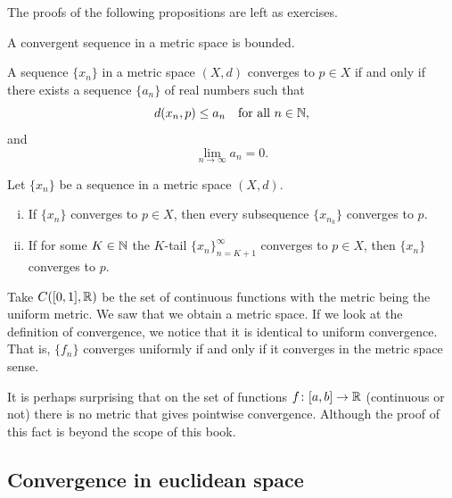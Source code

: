 The proofs of the following propositions are left as exercises.

\begin{prop} \label{prop:msconvbound}
A convergent sequence in a metric space is bounded.
\end{prop}

\begin{prop} \label{prop:msconvifa}
A sequence $\{ x_n \}$ in a metric space $(X,d)$ converges to $p \in X$
if and only
if there exists a sequence $\{ a_n \}$ of real numbers such that
\begin{equation*}
d(x_n,p) \leq a_n \quad \text{for all } n \in {\mathbb{N}},
\end{equation*}
and
\begin{equation*}
\lim_{n\to\infty} a_n = 0.
\end{equation*}
\end{prop}

\begin{prop} \label{prop:mssubseq}
Let $\{ x_n \}$ be a sequence in a metric space $(X,d)$.
\begin{enumerate}[(i)]
\item If $\{ x_n \}$ converges to $p \in X$, then every subsequence $\{ x_{n_k} \}$
converges to $p$.
\item If for some $K \in {\mathbb{N}}$ the $K$-tail $\{ x_n \}_{n=K+1}^\infty$
converges to $p \in X$, then
 $\{ x_n \}$ converges to $p$.
\end{enumerate}
\end{prop}

\begin{example}
Take $C([0,1],{\mathbb{R}})$ be the set of continuous functions with the metric being
the uniform metric.  We saw that we obtain a metric space.
If we look at the definition of convergence, we notice that it is identical
to uniform convergence.  That is, $\{ f_n \}$ converges uniformly if and only
if it converges in the metric space sense.
\end{example}

\begin{remark}
It is perhaps surprising that on the set of functions $f \colon [a,b] \to
{\mathbb{R}}$ (continuous or not)
there is no metric that gives pointwise convergence.  Although the proof of
this fact is beyond the scope of this book.
\end{remark}

\subsection{Convergence in euclidean space}

